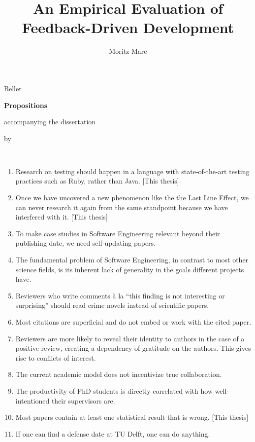 \documentclass{dissertation}
\begin{document}
\title{An Empirical Evaluation of Feedback-Driven Development}
\author{Moritz Marc}{Beller}

\begin{center}

{\Large\titlefont\bfseries Propositions}

\bigskip

accompanying the dissertation

\bigskip

{\makeatletter
\titlestyle\bfseries\large\@title
\makeatother}

{\makeatletter
\ifx\@subtitle\undefined\else
    \titlefont\titleshape\@subtitle
\fi
\makeatother}

\bigskip

by

\bigskip

\makeatletter
{\large\titlefont\bfseries\@firstname\ {\titleshape\@lastname}}
\makeatother

\end{center}

\bigskip
\bigskip

\begin{enumerate}
\item Research on testing should happen in a language with state-of-the-art testing practices such
  as Ruby, rather than Java. [This thesis]
\item Once we have uncovered a new phenomenon like the the Last Line Effect, we can never research
  it again from the same standpoint because we have interfered with it. [This thesis]
\item To make case studies in Software Engineering relevant beyond their publishing date, we need
  self-updating papers.
\item The fundamental problem of Software Engineering, in contrast to most other science
  fields, is its inherent lack of generality in the goals different projects have.
\item Reviewers who write comments à la ``this finding is not interesting or
  surprising'' should read crime novels instead of scientific papers.
\item Most citations are superficial and do not embed or work with the cited paper.
\item Reviewers are more likely to reveal their identity to authors in the case of a positive
  review, creating a dependency of gratitude on the authors. This gives rise to conflicts of
  interest.
\item The current academic model does not incentivize true collaboration.
\item The productivity of PhD students is directly correlated with how well-intentioned their
  supervisors are.
\item Most papers contain at least one statistical result that is wrong. [This
  thesis]
\item If one can find a defense date at TU Delft, one can do anything. 
\end{enumerate}
\end{document}

